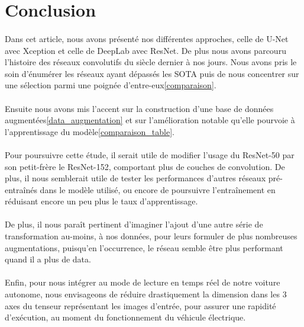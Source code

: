 \documentclass[
10pt,
a4paper, 
oneside, 
headinclude,footinclude, 
]{scrartcl}
\begin{document}
\section{Conclusion}
\paragraph{}Dans cet article, nous avons présenté nos différentes approches, celle de U-Net avec Xception et celle de DeepLab avec ResNet. De plus nous avons parcouru l’histoire des réseaux convolutifs du siècle dernier à nos jours. Nous avons pris le soin d’énumérer les réseaux ayant dépassés les SOTA puis de nous concentrer sur une sélection parmi une poignée d’entre-eux\ref{comparaison}.

\paragraph{}Ensuite nous avons mis l’accent sur la construction d’une base de données augmentées\ref{data_augmentation} et sur l’amélioration notable qu’elle pourvoie à l’apprentissage du modèle\ref{comparaison_table}.

\paragraph{}Pour poursuivre cette étude, il serait utile de modifier l’usage du ResNet-50 par son petit-frère le ResNet-152, comportant plus de couches de convolution. De plus, il nous semblerait utile de tester les performances d’autres réseaux pré-entraînés dans le modèle utilisé, ou encore de poursuivre l’entraînement en réduisant encore un peu plus le taux d’apprentissage.

\paragraph{}De plus, il nous paraît pertinent d’imaginer l’ajout d’une autre série de transformation au-moins, à nos données, pour leurs formuler de plus nombreuses augmentations, puisqu’en l’occurrence, le réseau semble être plus performant quand il a plus de data.
\paragraph{}Enfin, pour nous intégrer au mode de lecture en temps réel de notre voiture autonome, nous envisageons de réduire drastiquement la dimension dans les 3 axes du tenseur représentant les images d’entrée, pour assurer une rapidité d’exécution, au moment du fonctionnement du véhicule électrique.
\end{document}

